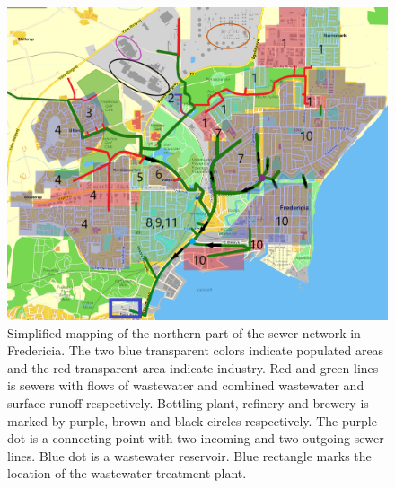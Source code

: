 \begin{figure}[H]
\centering
\includegraphics[width=1\textwidth]{report/system_overview/pictures/kloakgrid_simplified8.png}
\caption{Simplified mapping of the northern part of the sewer network in Fredericia. The two blue transparent colors indicate populated areas and the red transparent area indicate industry. Red and green lines is sewers with flows of wastewater and combined wastewater and surface runoff  respectively. Bottling plant, refinery and brewery is marked by purple, brown and black circles respectively. The purple dot is a connecting point with two incoming and two outgoing sewer lines. Blue dot is a wastewater reservoir. Blue rectangle marks the location of the wastewater treatment plant.
\cite{Krak}}
\label{fig:kloakgrid_simplified}
\end{figure}

